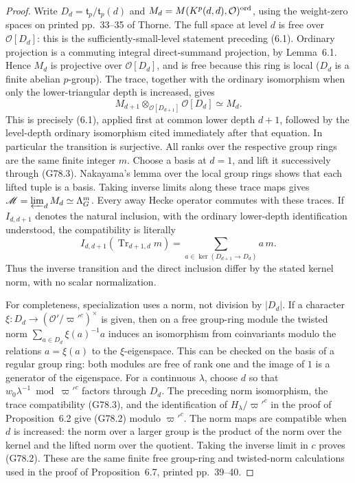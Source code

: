 \begin{proof}
Write \(D_d=\mathfrak t_p/\mathfrak t_p(d)\) and
\(M_d=M(K^p(d,d),\mathcal O)^{\rm ord}\), using the weight-zero
spaces on printed pp.~33--35 of Thorne.
The full space at level \(d\) is free over \(\mathcal O[D_d]\):
this is the sufficiently-small-level statement preceding (6.1).
Ordinary projection is a commuting integral direct-summand
projection, by Lemma~6.1.  Hence \(M_d\) is projective over
\(\mathcal O[D_d]\), and is free because this ring is local
(\(D_d\) is a finite abelian \(p\)-group).
The trace, together with the ordinary isomorphism when only the
lower-triangular depth is increased, gives
\[
 M_{d+1}\otimes_{\mathcal O[D_{d+1}]}\mathcal O[D_d]
                      \simeq M_d.                    \tag{G78.3}
\]
This is precisely (6.1), applied first at common lower depth
\(d+1\), followed by the level-depth ordinary isomorphism cited
immediately after that equation.  In particular the transition
is surjective.  All ranks over the respective group rings are
the same finite integer \(m\).
Choose a basis at \(d=1\), and lift it successively through
(G78.3).  Nakayama's lemma over the local group rings shows that
each lifted tuple is a basis.  Taking inverse limits along these
trace maps gives
\(\mathscr M=\varprojlim_d M_d\simeq\Lambda_G^m\).
Every away Hecke operator commutes with these traces.
If \(I_{d,d+1}\) denotes the natural inclusion, with the ordinary
lower-depth identification understood, the compatibility is literally
\[
 I_{d,d+1}(\operatorname{Tr}_{d+1,d}m)
       =\sum_{a\in\ker(D_{d+1}\to D_d)}a\,m.
\]
Thus the inverse transition and the direct inclusion differ by
the stated kernel norm, with no scalar normalization.

For completeness, specialization uses a norm, not division by
\(|D_d|\).  If a character \(\xi:D_d\to(\mathcal O'/\varpi'^c)^\times\)
is given, then on a free group-ring module the twisted norm
\(\sum_{a\in D_d}\xi(a)^{-1}a\) induces an isomorphism from
coinvariants modulo the relations \(a=\xi(a)\) to the
\(\xi\)-eigenspace.  This can be checked on the basis of a regular
group ring: both modules are free of rank one and the image of
\(1\) is a generator of the eigenspace.
For a continuous \(\lambda\), choose \(d\) so that
\(w_0\lambda^{-1}\bmod\varpi'^c\) factors through \(D_d\).
The preceding norm isomorphism, the trace compatibility
(G78.3), and the identification of
\(H_\lambda/\varpi'^c\) in the proof of Proposition~6.2 give
(G78.2) modulo \(\varpi'^c\).
The norm maps are compatible when \(d\) is increased:
the norm over a larger group is the product of the norm over
the kernel and the lifted norm over the quotient.
Taking the inverse limit in \(c\) proves (G78.2).
These are the same finite free group-ring and twisted-norm
calculations used in the proof of Proposition~6.7, printed
pp.~39--40.
\end{proof}

